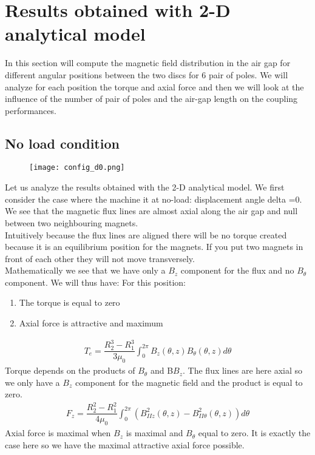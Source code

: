\section{Results obtained with 2-D analytical model}
In this section will compute the magnetic field distribution in the air gap for different angular positions between the two discs for 6 pair of poles. We will analyze for each position the torque and axial force and then we will look at the influence of the number of pair of poles and the air-gap length on the coupling performances. 
\subsection*{No load condition}
\begin{figure}[H]
    \centering
    \texttt{[image: config\_d0.png]}
\end{figure}
Let us analyze the results obtained with the 2-D analytical model. We first consider the case where the machine it at no-load: displacement angle delta =0.
We see that the magnetic flux lines are almost axial along the air gap and null between two neighbouring magnets.\\
Intuitively because the flux lines are aligned there will be no torque created because it is an equilibrium position for the magnets. If you put two magnets in front of each other they will not move transversely.\\
Mathematically we see that we have only a $B_{z}$ component for the flux and no $B_{\theta}$ component. We will thus have:
 For this position:
 \begin{enumerate}
     \item The torque is equal to zero
     \item Axial force is attractive and maximum
 \end{enumerate}
    \begin{align*}
 T_e = \dfrac{R_2^3-R_1^3}{3\mu_0}\int_0^{2\pi}B_z(\theta,z)B_{\theta}(\theta,z)d\theta
\end{align*}	
Torque depends on the products of $B_{\theta}$ and B$B_{z}$. The flux lines are here axial so we only have a $B_{z}$ component for the magnetic field and the product is equal to zero.
 \begin{align*}
    F_z =\dfrac{R_2^2-R_1^2}{4\mu_0}\int_0^{2\pi}\left(B^2_{IIz}(\theta,z)-B^2_{II\theta}(\theta,z)\right)d\theta
    \end{align*}
Axial force is maximal when $B_{z}$ is maximal and $B_{\theta}$ equal to zero. It is exactly the case here so we have the maximal attractive axial force possible. 
